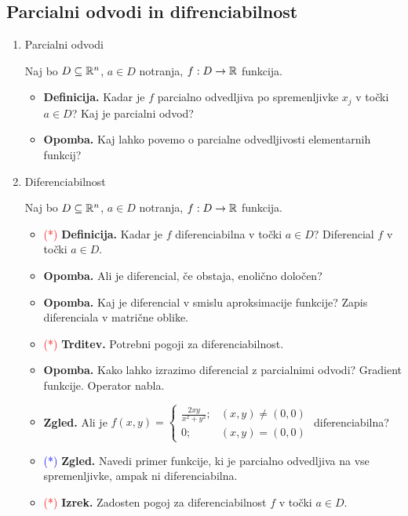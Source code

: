 \subsection{Parcialni odvodi in difrenciabilnost}
\begin{enumerate}
    \item Parcialni odvodi
    
    Naj bo $D \subseteq \mathbb{R}^n$, $a \in D$ notranja, $f: D \to \mathbb{R}$ funkcija.
    
    \begin{itemize}
        \item \textbf{Definicija.} Kadar je $f$ parcialno odvedljiva po spremenljivke $x_j$ v točki $a \in D$? Kaj je parcialni odvod?
        \item \textbf{Opomba.} Kaj lahko povemo o parcialne odvedljivosti elementarnih funkcij?
    \end{itemize}

    \item Diferenciabilnost
    
    Naj bo $D \subseteq \mathbb{R}^n$, $a \in D$ notranja, $f: D \to \mathbb{R}$ funkcija.
    
    \begin{itemize}
        \item \textcolor{red}{(*)} \textbf{Definicija.} Kadar je $f$ diferenciabilna v točki $a \in D$? Diferencial $f$ v točki $a \in D$.
        \item \textbf{Opomba.} Ali je diferencial, če obstaja, enolično določen?
        \item \textbf{Opomba.} Kaj je diferencial v smislu aproksimacije funkcije? Zapis diferenciala v matrične oblike.
        \item \textcolor{red}{(*)} \textbf{Trditev.} Potrebni pogoji za diferenciabilnost.
        \item \textbf{Opomba.} Kako lahko izrazimo diferencial z parcialnimi odvodi? Gradient funkcije. Operator nabla.
        \item \textbf{Zgled.} Ali je $f(x, y) = \begin{cases}
            \frac{2xy}{x^2+y^2}; &(x, y) \neq (0,0) \\ 0; &(x, y) = (0,0)
        \end{cases}$ diferenciabilna?
        \item \textcolor{blue}{(*)} \textbf{Zgled.} Navedi primer funkcije, ki je parcialno odvedljiva na vse spremenljivke, ampak ni diferenciabilna.
        \item \textcolor{red}{(*)} \textbf{Izrek.} Zadosten pogoj za diferenciabilnost $f$ v točki $a \in D$.
    \end{itemize}


\end{enumerate}
